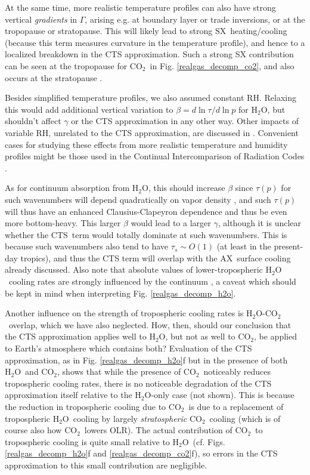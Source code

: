 \documentclass{ametsoc}
\newcommand{\cotwo}{\ensuremath{\mathrm{CO_2}}}
\newcommand{\htwo}{\ensuremath{\mathrm{H_2O}}}
\newcommand{\RH}{\ensuremath{\mathrm{RH}}}
\newcommand{\taus}{\ensuremath{\tau_s}}
\newcommand{\SX}{\ensuremath{\mathrm{SX}}}
\newcommand{\AX}{\ensuremath{\mathrm{AX}}}
\newcommand{\CTS}{\ensuremath{\mathrm{CTS}}}
\begin{document}
At the same time, more realistic temperature profiles can also have strong vertical \emph{gradients} in $\Gamma$, arising e.g. at boundary layer or trade inversions, or at the tropopause or stratopause. This will likely lead to strong \SX\ heating/cooling (because this term measures curvature in the temperature profile), and hence to a localized breakdown in  the CTS approximation. Such a strong SX contribution can be seen  at the tropopause for \cotwo\ in Fig. \ref{realgas_decomp_co2}, and also occurs at the stratopause \citep[e.g.][]{clough1995,zhu1992}. 

Besides simplified temperature profiles, we also assumed constant \RH.  Relaxing this would add additional vertical variation to  $\beta = d \ln \tau /d \ln p$ for \htwo, but shouldn't affect $\gamma$ or the CTS approximation in any other way. Other impacts of variable \RH, unrelated to the CTS approximation, are discussed in \cite{jeevanjee2019a}.   Convenient cases for studying these effects from more realistic temperature and humidity profiles might be those used in the Continual Intercomparison of Radiation Codes \citep[CIRC;][]{oreopoulos2010}. 

As for continuum absorption from \htwo, this should increase $\beta$ since $\tau(p)$ for such wavenumbers will depend quadratically on vapor density \citep[because continuum pressure-broadening is largely self-broadening, e.g.][]{pierrehumbert2010}, and such $\tau(p)$  will thus have an enhanced Clausius-Clapeyron dependence and thus be even more bottom-heavy. This larger $\beta$ would lead to a larger $\gamma$, although it is unclear whether the \CTS\ term would totally dominate at such wavenumbers. This is because such wavenumbers also tend to have $\taus \sim O(1)$ (at least in the present-day tropics), and thus the CTS term will overlap with the \AX\ surface cooling already discussed. Also note that absolute values of lower-tropospheric \htwo\ cooling rates are strongly influenced by the continuum \citep{jeevanjee2019a}, a caveat which should be kept in mind when interpreting Fig. \ref{realgas_decomp_h2o}. 

Another influence on the strength of tropospheric cooling rates is \htwo-\cotwo\ overlap, which we have also neglected. How, then, should our conclusion that the CTS approximation applies well to \htwo, but not as well to \cotwo, be applied to Earth's atmosphere which contains both? Evaluation of the CTS approximation, as in Fig. \ref{realgas_decomp_h2o}f but in the presence of both \htwo\ and \cotwo, shows that while the presence of \cotwo\ noticeably reduces tropospheric cooling rates, there is no noticeable degradation of the CTS approximation itself relative to the \htwo-only case (not shown). This is because the reduction in tropospheric cooling due to \cotwo\ is due to a replacement of tropospheric \htwo\ cooling by largely \emph{stratospheric} \cotwo\ cooling (which is of course also how \cotwo\ lowers OLR). The actual contribution of \cotwo\ to tropospheric cooling is quite small relative to \htwo\ (cf. Figs. \ref{realgas_decomp_h2o}f and \ref{realgas_decomp_co2}f), so errors in the CTS approximation to this small contribution are negligible.
\end{document}
